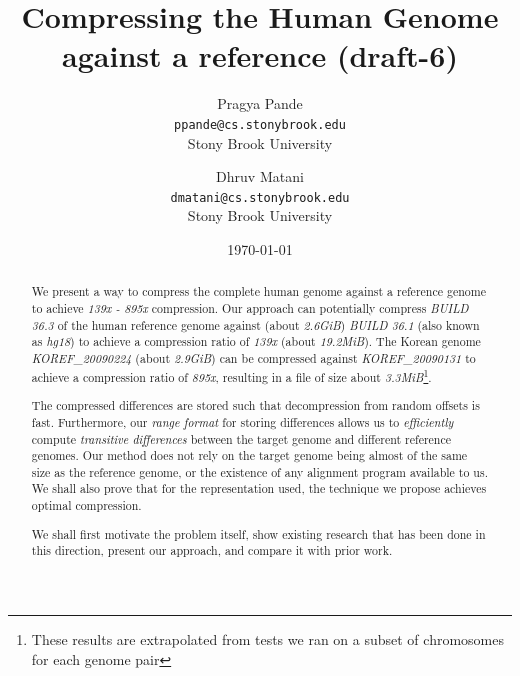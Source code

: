 \documentclass[11pt]{article}
\begin{document}
\title{Compressing the Human Genome against a reference (draft-6)}
\author{Pragya Pande\\\texttt{\small{ppande@cs.stonybrook.edu}}\\\small{Stony Brook University} \and 
  Dhruv Matani\\\texttt{\small{dmatani@cs.stonybrook.edu}}\\\small{Stony Brook University}
}
\date{\today}

\maketitle

\vspace{0.5in}

\begin{abstract}
  We present a way to compress the complete human genome against a
  reference genome to achieve \textit{139x - 895x} compression. Our
  approach can potentially compress \textit{BUILD 36.3} of the human
  reference genome against (about \textit{2.6GiB}) \textit{BUILD 36.1}
  (also known as \textit{hg18}) to achieve a compression ratio of
  \textit{139x} (about \textit{19.2MiB}). The Korean genome
  \textit{KOREF\_20090224} (about \textit{2.9GiB}) can be compressed
  against \textit{KOREF\_20090131} to achieve a compression ratio of
  \textit{895x}, resulting in a file of size about
  \textit{3.3MiB}\footnote{These results are extrapolated from tests
    we ran on a subset of chromosomes for each genome pair}.

  The compressed differences are stored such that decompression from
  random offsets is fast. Furthermore, our \textit{range format} for
  storing differences allows us to \textit{efficiently} compute
  \textit{transitive differences} between the target genome and
  different reference genomes. Our method does not rely on the target
  genome being almost of the same size as the reference genome, or the
  existence of any alignment program available to us. We shall also
  prove that for the representation used, the technique we propose
  achieves optimal compression.

  We shall first motivate the problem itself, show existing research
  that has been done in this direction, present our approach, and
  compare it with prior work.

\end{abstract}

\setlength{\parskip}{0.7ex plus 0.5ex minus 0.2ex}
\end{document}
